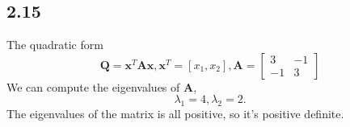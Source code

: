 \documentclass{article}
\begin{document}
\subsection*{2.15}
The quadratic form
\begin{equation*}
  \mathbf{Q} = \mathbf{x}^T\mathbf{Ax}, \mathbf{x}^T = \left[x_1, x_2\right], \mathbf{A} = \left[
        \begin{matrix}
          3&-1\\
          -1&3
        \end{matrix}\right]
\end{equation*}
We can compute the eigenvalues of $\mathbf{A}$,
\begin{equation*}
  \lambda_1 = 4, \lambda_2 = 2.
\end{equation*}
The eigenvalues of the matrix is all positive, so it's positive definite.
\end{document}
